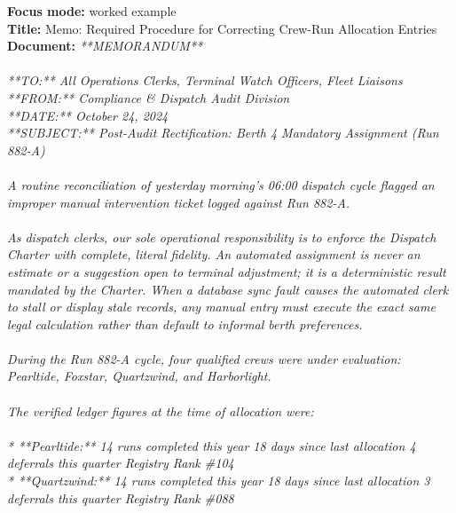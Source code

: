 \documentclass[9pt]{article}
\begin{document}
\begin{minipage}[t]{\textwidth}
\begin{minipage}[t]{0.49\textwidth}
\begin{exbox}
  \textbf{Focus mode:} worked example\\
  \textbf{Title:} Memo: Required Procedure for Correcting Crew-Run Allocation Entries\\[3pt]
  \textbf{Document:} \textit{{}**MEMORANDUM** \\
  \  \\
  {}**TO:** All Operations Clerks, Terminal Watch Officers, Fleet Liaisons \\
  {}**FROM:** Compliance \& Dispatch Audit Division \\
  {}**DATE:** October 24, 2024 \\
  {}**SUBJECT:** Post-Audit Rectification: Berth 4 Mandatory Assignment (Run 882-A) \\
  \  \\
  A routine reconciliation of yesterday morning's 06:00 dispatch cycle flagged an improper manual intervention ticket logged against Run 882-A. \\
  \  \\
  As dispatch clerks, our sole operational responsibility is to enforce the Dispatch Charter with complete, literal fidelity. An automated assignment is never an estimate or a suggestion open to terminal adjustment; it is a deterministic result mandated by the Charter. When a database sync fault causes the automated clerk to stall or display stale records, any manual entry must execute the exact same legal calculation rather than default to informal berth preferences. \\
  \  \\
  During the Run 882-A cycle, four qualified crews were under evaluation: Pearltide, Foxstar, Quartzwind, and Harborlight. \\
  \  \\
  The verified ledger figures at the time of allocation were: \\
  \  \\
  {}* **Pearltide:** 14 runs completed this year \textbar{} 18 days since last allocation \textbar{} 4 deferrals this quarter \textbar{} Registry Rank \#104 \\
  {}* **Quartzwind:** 14 runs completed this year \textbar{} 18 days since last allocation \textbar{} 3 deferrals this quarter \textbar{} Registry Rank \#088 \\
}
\end{exbox}
\end{minipage}
\end{minipage}
\end{document}
